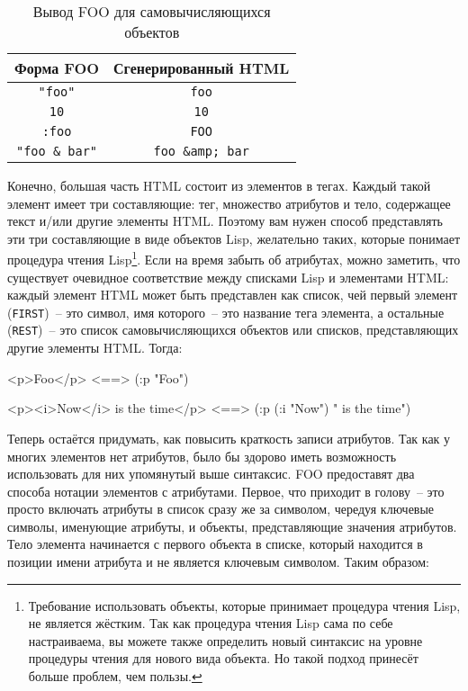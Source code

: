 \begin{table}[tb]
\begin{tabular}{|c|c|}
\hline
  Форма FOO & Сгенерированный HTML \\
\hline
  \lstinline!"foo"! &\lstinline!foo! \\
  \lstinline!10! & \lstinline!10! \\
  \lstinline!:foo! & \lstinline!FOO! \\
  \lstinline!"foo & bar"! & \lstinline!foo &amp; bar!\\
\hline
\end{tabular}
  \caption{Вывод FOO для самовычисляющихся объектов} 
  \label{table:30-1}
\end{table}

Конечно, большая часть HTML состоит из элементов в тегах. Каждый такой элемент имеет три
составляющие: тег, множество атрибутов и тело, содержащее текст и/или другие элементы
HTML. Поэтому вам нужен способ представлять эти три составляющие в виде объектов Lisp,
желательно таких, которые понимает процедура чтения Lisp\footnote{Требование использовать
  объекты, которые принимает процедура чтения Lisp, не является жёстким. Так как процедура
  чтения Lisp сама по себе настраиваема, вы можете также определить новый синтаксис на
  уровне процедуры чтения для нового вида объекта. Но такой подход принесёт больше
  проблем, чем пользы.}. Если на время забыть об атрибутах, можно заметить, что существует
очевидное соответствие между списками Lisp и элементами HTML: каждый элемент HTML может
быть представлен как список, чей первый элемент (\lstinline{FIRST})~-- это символ, имя
которого~-- это название тега элемента, а остальные (\lstinline{REST})~-- это список
самовычисляющихся объектов или списков, представляющих другие элементы HTML. Тогда:

\begin{myverb}
<p>Foo</p> <==> (:p "Foo")

<p><i>Now</i> is the time</p> <==> (:p (:i "Now") " is the time")
\end{myverb}

Теперь остаётся придумать, как повысить краткость записи атрибутов. Так как у многих
элементов нет атрибутов, было бы здорово иметь возможность использовать для них упомянутый
выше синтаксис. FOO предоставят два способа нотации элементов с атрибутами. Первое, что
приходит в голову~-- это просто включать атрибуты в список сразу же за символом, чередуя
ключевые символы, именующие атрибуты, и объекты, представляющие значения атрибутов. Тело
элемента начинается с первого объекта в списке, который находится в позиции имени атрибута
и не является ключевым символом. Таким образом:

